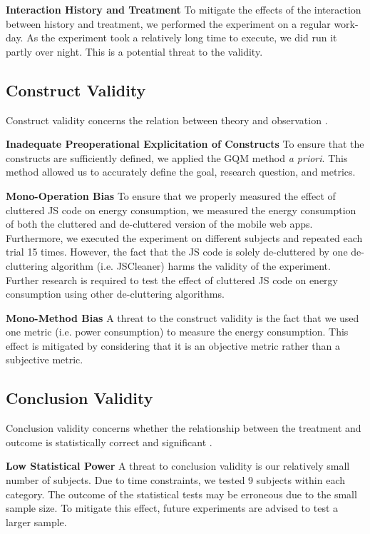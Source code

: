 \noindent \textbf{Interaction History and Treatment}
To mitigate the effects of the interaction between history and treatment, we performed the experiment on a regular work-day. As the experiment took a relatively long time to execute, we did run it partly over night. This is a potential threat to the validity.

\subsection{Construct Validity}

Construct validity concerns the relation between theory and observation \cite{wohlin2012experimentation}. 

\noindent \textbf{Inadequate Preoperational Explicitation of Constructs}
To ensure that the constructs are sufficiently defined, we applied the GQM method \textit{a priori}. This method allowed us to accurately define the goal, research question, and metrics.

\noindent \textbf{Mono-Operation Bias}
To ensure that we properly measured the effect of cluttered JS code on energy consumption, we measured the energy consumption of both the cluttered and de-cluttered version of the mobile web apps. Furthermore, we executed the experiment on different subjects and repeated each trial 15 times. However, the fact that the JS code is solely de-cluttered by one de-cluttering algorithm (i.e. JSCleaner) harms the validity of the experiment. Further research is required to test the effect of cluttered JS code on energy consumption using other de-cluttering algorithms. 

\noindent \textbf{Mono-Method Bias}
A threat to the construct validity is the fact that we used one metric (i.e. power consumption) to measure the energy consumption. This effect is mitigated by considering that it is an objective metric rather than a subjective metric.

\subsection{Conclusion Validity}

Conclusion validity concerns whether the relationship between the treatment and outcome is statistically correct and significant \cite{wohlin2012experimentation}.

\noindent \textbf{Low Statistical Power}
A threat to conclusion validity is our relatively small number of subjects. Due to time constraints, we tested 9 subjects within each category. The outcome of the statistical tests may be erroneous due to the small sample size. To mitigate this effect, future experiments are advised to test a larger sample. 

